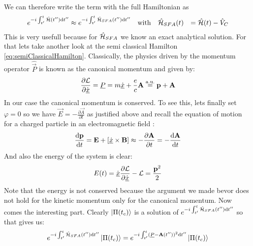 We can therefore write the term with the full Hamiltonian as
\begin{equation*}
    \begin{aligned}
        e^{-i \int_{t'}^{t} \hat{\mathcal{H}}(t'') \mathrm{d} t''} &\approx e^{-i \int_{t'}^{t} \hat{\mathcal{H}}_{SFA}(t'') \mathrm{d} t''} \quad \text{with} \quad \hat{\mathcal{H}}_{SFA}(t) &= \hat{\mathcal{H}}(t) - \hat{V}_C
    \end{aligned}
\end{equation*}
This is very usefull because for $\hat{\mathcal{H}}_{SFA}$ we know an exact analytical solution. For that lets take another look at the semi classical Hamilton \eqref{eq:semiClassicalHamilton}. 
Classically, the physics driven by the momentum operator $\hat{\vec{P}}$ is known as the canonical momentum and given by:
\begin{equation*}
    \frac{\partial \mathcal{L}}{\partial \dot{\underline{x}}} = \underline{P} = m\underline{\dot{x}} + \frac{e}{c}\mathbf{A} \stackrel{\mathrm{a.u.}}{=} \mathbf{p} + \mathbf{A}
\end{equation*}
In our case the canonical momentum is conserved. To see this, lets finally set $\varphi=0$ so we have $\vec{E} = -\frac{\partial \vec{A}}{\partial t}$ as justified above and recall the equation of motion for a charged particle in an electromagnetic field \cite{LandauLifschitzBand2}:
\begin{equation*}
    \frac{\dd\vec{p}}{\dd t} = \vec{E} + \left[\uvec{\dot{x}}\times\vec{B}\right] \approx -\frac{\partial \vec{A}}{\partial t} = -\frac{\dd \vec{A}}{\dd t}   %
\end{equation*}
And also the energy of the system is clear:
\begin{equation*}
    E(t) = \dot{\underline{x}}\frac{\partial \mathcal{L}}{\partial \dot{\underline{x}}}-\mathcal{L} = \frac{\mathbf{p}^2}{2}
\end{equation*}
Note that the energy is not conserved because the argument we made bevor does not hold for the kinetic momentum only for the canonical momentum.
Now comes the interesting part. Clearly $\ket{\Pi(t_c)}$ is a solution of $e^{-i \int_{t'}^{t} \hat{\mathcal{H}}_{SFA}(t'') \mathrm{d} t''}$ so that gives us:
\begin{equation*}
    e^{-i \int_{t'}^{t} \hat{\mathcal{H}}_{SFA}(t'') \mathrm{d} t''}\ket{\Pi(t_c)} = e^{-i \int_{t'}^{t} (\underline{P} - \mathbf{A}(t''))^2 \mathrm{d} t''}\ket{\Pi(t_c)}
\end{equation*}
